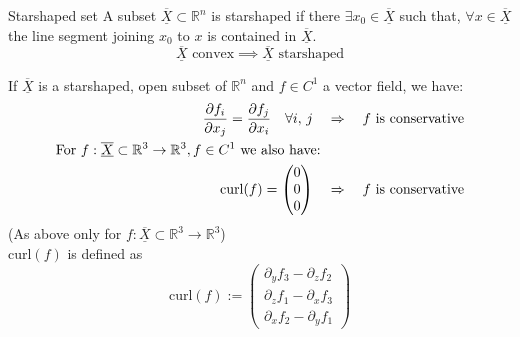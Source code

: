 \documentclass[a4paper,fontsize = 8pt]{scrartcl}
\def\R{\mathbb{R}}
\def\X{\underline{\overline{X}}}
\begin{document}
\begin{subbox}{Starshaped set}
  A subset \(\X \subset \R^n\) is starshaped if there \(\exists x_0 \in \X\) such that, \(\forall x \in \X\) the line segment joining \(x_0\) to \(x\) is contained in \(\X\). 
  \[\X \text{ convex} \implies \X \text{ starshaped}\]
\end{subbox}
If \(\X\) is a starshaped, open subset of \(\R^n\) and \(f \in C^1\) a vector field, we have:
\begin{align*}
    \pdv{f_i}{x_j} = \pdv{f_j}{x_i} \quad \forall i,\, j
  \quad &\Rightarrow \quad \text{$f$ is conservative}\\
  \text{For $f: \X \subset \R^3 \to \R^3, f \in C^1$ we also have: }\\
  \text{curl}(f) = \begin{pmatrix}
    0\\0\\0
  \end{pmatrix}
  \quad &\Rightarrow \quad \text{$f$ is conservative}
\end{align*}
(As above only for $f: \X \subset \R^3 \to \R^3$) 
\\\(\text{curl}(f)\) is defined as
\[\text{curl}(f) := \begin{pmatrix}
  \partial_y f_3 - \partial_z f_2 \\
  \partial_z f_1 - \partial_x f_3 \\
  \partial_x f_2 - \partial_y f_1
\end{pmatrix}\]
\end{document}
